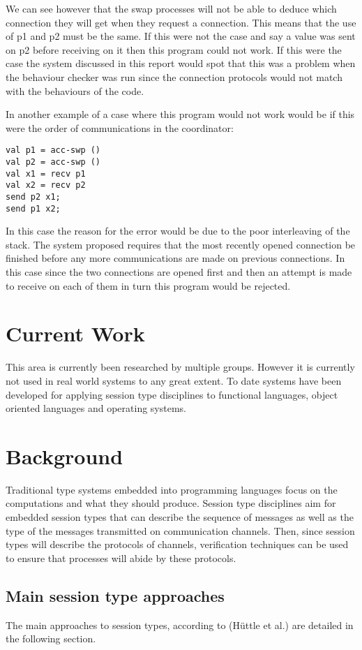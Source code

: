 We can see however that the swap processes will not be able to deduce which connection they will get when they request a connection. This means that the use of p1 and p2 must be the same. If this were not the case and say a value was sent on p2 before receiving on it then this program could not work. If this were the case the system discussed in this report would spot that this was a problem when the behaviour checker was run since the connection protocols would not match with the behaviours of the code. 

In another example of a case where this program would not work would be if this were the order of communications in the coordinator: 
\begin{lstlisting}
val p1 = acc-swp ()
val p2 = acc-swp ()
val x1 = recv p1
val x2 = recv p2
send p2 x1; 
send p1 x2; 
\end{lstlisting}
In this case the reason for the error would be due to the poor interleaving of the stack. The system proposed requires that the most recently opened connection be finished before any more communications are made on previous connections. In this case since the two connections are opened first and then an attempt is made to receive on each of them in turn this program would be rejected. 

\section{Current Work}
This area is currently been researched by multiple groups. However it is currently not used in real world systems to any great extent. To date systems have been developed for applying session type disciplines to functional languages, object oriented languages and operating systems. 

\section{Background}
Traditional type systems embedded into programming languages focus on the computations and what they should produce. Session type disciplines aim for embedded session types that can describe the sequence of messages as well as the type of the messages transmitted on communication channels. Then, since session types will describe the protocols of channels, verification techniques can be used to ensure that processes will abide by these protocols. 

\subsection{Main session type approaches}
The main approaches to session types, according to (H\"{u}ttle et al.) \cite{foundBTypes} are detailed in the following section.

